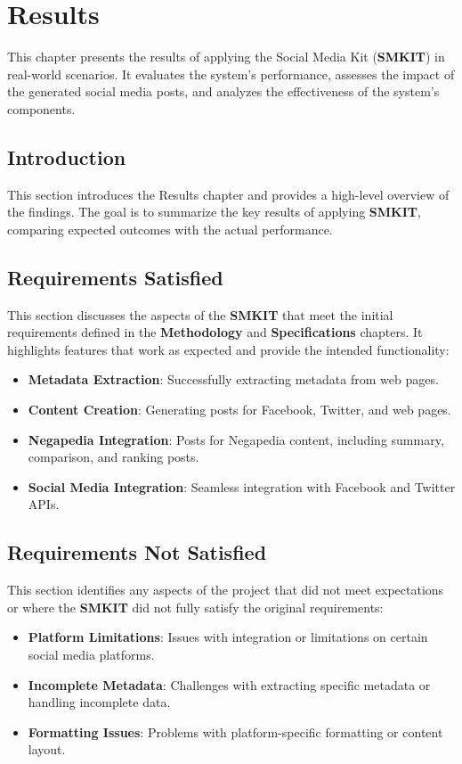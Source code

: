 
\chapter{Results}
\label{chp:results}
This chapter presents the results of applying the Social Media Kit (\textbf{SMKIT}) in real-world scenarios. It evaluates the system's performance, assesses the impact of the generated social media posts, and analyzes the effectiveness of the system's components.


\section{Introduction}
\label{sec:results_introduction}
This section introduces the Results chapter and provides a high-level overview of the findings. The goal is to summarize the key results of applying \textbf{SMKIT}, comparing expected outcomes with the actual performance.


\section{Requirements Satisfied}
\label{sec:requirements_satisfied}
This section discusses the aspects of the \textbf{SMKIT} that meet the initial requirements defined in the \textbf{Methodology} and \textbf{Specifications} chapters. It highlights features that work as expected and provide the intended functionality:
\begin{itemize}
    \item \textbf{Metadata Extraction}: Successfully extracting metadata from web pages.
    \item \textbf{Content Creation}: Generating posts for Facebook, Twitter, and web pages.
    \item \textbf{Negapedia Integration}: Posts for Negapedia content, including summary, comparison, and ranking posts.
    \item \textbf{Social Media Integration}: Seamless integration with Facebook and Twitter APIs.
\end{itemize}


\section{Requirements Not Satisfied}
\label{sec:requirements_not_satisfied}
This section identifies any aspects of the project that did not meet expectations or where the \textbf{SMKIT} did not fully satisfy the original requirements:
\begin{itemize}
    \item \textbf{Platform Limitations}: Issues with integration or limitations on certain social media platforms.
    \item \textbf{Incomplete Metadata}: Challenges with extracting specific metadata or handling incomplete data.
    \item \textbf{Formatting Issues}: Problems with platform-specific formatting or content layout.
\end{itemize}


